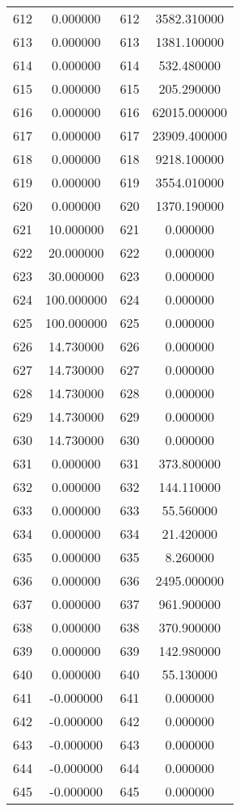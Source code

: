 \documentclass[12pt]{article}
\begin{document}
\begin{longtable}{@{}cccc@{}}
612 & 0.000000 & 612 & 3582.310000 \\
613 & 0.000000 & 613 & 1381.100000 \\
614 & 0.000000 & 614 & 532.480000 \\
615 & 0.000000 & 615 & 205.290000 \\
616 & 0.000000 & 616 & 62015.000000 \\
617 & 0.000000 & 617 & 23909.400000 \\
618 & 0.000000 & 618 & 9218.100000 \\
619 & 0.000000 & 619 & 3554.010000 \\
620 & 0.000000 & 620 & 1370.190000 \\
621 & 10.000000 & 621 & 0.000000 \\
622 & 20.000000 & 622 & 0.000000 \\
623 & 30.000000 & 623 & 0.000000 \\
624 & 100.000000 & 624 & 0.000000 \\
625 & 100.000000 & 625 & 0.000000 \\
626 & 14.730000 & 626 & 0.000000 \\
627 & 14.730000 & 627 & 0.000000 \\
628 & 14.730000 & 628 & 0.000000 \\
629 & 14.730000 & 629 & 0.000000 \\
630 & 14.730000 & 630 & 0.000000 \\
631 & 0.000000 & 631 & 373.800000 \\
632 & 0.000000 & 632 & 144.110000 \\
633 & 0.000000 & 633 & 55.560000 \\
634 & 0.000000 & 634 & 21.420000 \\
635 & 0.000000 & 635 & 8.260000 \\
636 & 0.000000 & 636 & 2495.000000 \\
637 & 0.000000 & 637 & 961.900000 \\
638 & 0.000000 & 638 & 370.900000 \\
639 & 0.000000 & 639 & 142.980000 \\
640 & 0.000000 & 640 & 55.130000 \\
641 & -0.000000 & 641 & 0.000000 \\
642 & -0.000000 & 642 & 0.000000 \\
643 & -0.000000 & 643 & 0.000000 \\
644 & -0.000000 & 644 & 0.000000 \\
645 & -0.000000 & 645 & 0.000000 \\

\end{longtable}
\end{document}
